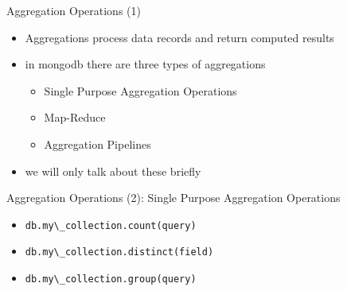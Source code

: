 \begin{frame}{Aggregation Operations (1)}
  \begin{itemize}
      \item Aggregations process data records and return computed results
      \item in mongodb there are three types of aggregations
      \begin{itemize}
        \item Single Purpose Aggregation Operations
        \item Map-Reduce
        \item Aggregation Pipelines
      \end{itemize}
      \item we will only talk about these briefly
  \end{itemize}
\end{frame}

\begin{frame}{Aggregation Operations (2): Single Purpose Aggregation Operations}
  \begin{itemize}
    \item \lstinline[basicstyle=\ttfamily]{db.my\_collection.count(query)}
    \item \lstinline[basicstyle=\ttfamily]{db.my\_collection.distinct(field)}
    \item \lstinline[basicstyle=\ttfamily]{db.my\_collection.group(query)}
    \end{itemize}
\end{frame}

